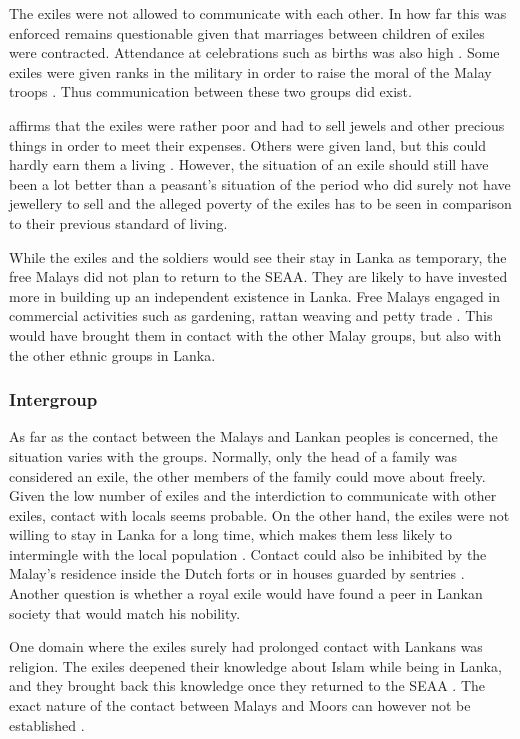 The exiles were not allowed to communicate with each  other. In how far this was enforced remains questionable given that marriages between children of exiles were contracted. Attendance at celebrations such as births was also high \citep[43f]{Hussainmiya1990}.
Some exiles were given ranks in the military in order to raise the moral of the Malay troops \citep[50]{Hussainmiya1990}. Thus communication between these two groups did exist.

\citet[41]{Hussainmiya1990} affirms that the exiles were rather poor and had to sell jewels and other precious things in order to meet their expenses. Others were given land, but this could hardly earn them a living \citep[45]{Hussainmiya1990}.
However, the situation of an exile should still have been a lot better than a peasant's situation of the period who did surely not have jewellery to sell and the alleged poverty of the exiles has to be seen in comparison to their previous standard of living.

While the exiles and the soldiers would see their stay in Lanka as temporary, the free Malays did not plan to return to the SEAA. They are likely to have invested more in building up an independent existence in Lanka. Free Malays engaged in commercial activities such as
gardening, rattan weaving and petty trade \citep[53]{Hussainmiya1987}. This would have brought them in contact with the other Malay groups, but also with the other ethnic groups in Lanka.

\subsubsection{Intergroup}\label{sec:slmbg:Intergroup}
As far as the contact between the Malays and Lankan peoples is concerned, the situation varies with the groups. Normally, only the head of a family was considered an exile, the other members of the family could move about freely. Given the low number of exiles and the interdiction to communicate with other exiles, contact with locals seems probable. On the other hand, the exiles were not willing to stay in Lanka for a long time, which makes them less likely to intermingle with the local population \citep[cf.][160]{Muysken2000}. Contact could also be inhibited by the Malay's residence inside the Dutch forts or in houses guarded by sentries \citep[43]{Hussainmiya1987}. Another question is whether a royal exile would have found a peer in Lankan society that would match his nobility\kuckn.

One domain where the exiles surely had prolonged contact with Lankans was religion. The exiles deepened their knowledge about  Islam while being in Lanka, and  they brought back this knowledge once they returned to the SEAA  \citep[45f]{Hussainmiya1987}.
The exact nature of the contact between Malays and Moors can however not be established
\citep[41]{Hussainmiya1990}.

